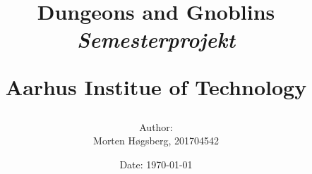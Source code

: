\newcommand{\authorName}{Morten Høgsberg}
\newcommand{\titleName}{Dungeons and Gnoblins}
\newcommand{\subject}{Semesterprojekt}
\newcommand{\institute}{Aarhus Institue of Technology}
\begin{titlepage}
  \centering
    \title
    {
      \Huge \textbf{\titleName}\\
      \scale{\numberSQRTTWO}{\vspace{\sol pt}}
      \LARGE \textit{\subject}
      \scale{\numberSQRTTWO}{\rule{\linewidth}{\sol pt}}

      \textbf{\institute}
      \author
    {
      \LARGE Author: \\
      Morten Høgsberg, 201704542 \\ 
    }
      \date{\LARGE Date: \today}
    }
\end{titlepage}
